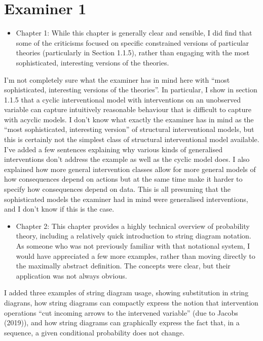 \documentclass[12pt, a4paper]{article}
\begin{document}
\section{Examiner 1}

\begin{itemize}
    \item Chapter 1: While this chapter is generally clear and sensible, I did find that some of the criticisms focused on specific constrained versions of particular theories (particularly in Section 1.1.5), rather than engaging with the most sophisticated, interesting versions of the theories.
\end{itemize}

I'm not completely sure what the examiner has in mind here with ``most sophisticated, interesting versions of the theories''. In particular, I show in section 1.1.5 that a cyclic interventional model with interventions on an unobserved variable can capture intuitively reasonable behaviour that is difficult to capture with acyclic models. I don't know what exactly the examiner has in mind as the ``most sophisticated, interesting version'' of structural interventional models, but this is certainly not the simplest class of structural interventional model available. I've added a few sentences explaining why various kinds of generalised interventions don't address the example as well as the cyclic model does. I also explained how more general intervention classes allow for more general models of how consequences depend on actions but at the same time make it harder to specify how consequences depend on data. This is all presuming that the sophisticated models the examiner had in mind were generalised interventions, and I don't know if this is the case.

\begin{itemize}
    \item Chapter 2: This chapter provides a highly technical overview of probability theory, including a relatively quick introduction to string diagram notation. As someone who was not previously familiar with that notational system, I would have appreciated a few more examples, rather than moving directly to the maximally abstract definition. The concepts were clear, but their application was not always obvious.
\end{itemize}

I added three examples of string diagram usage, showing substitution in string diagrans, how string diagrams can compactly express the notion that intervention operations ``cut incoming arrows to the intervened variable'' (due to Jacobs (2019)), and how string diagrams can graphically express the fact that, in a sequence, a given conditional probability does not change.
\end{document}
